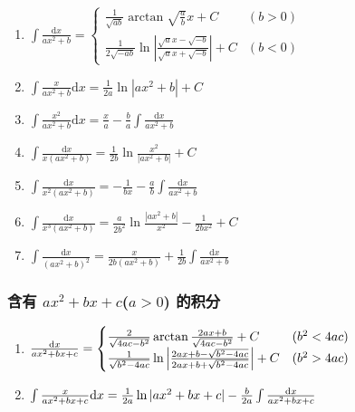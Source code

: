 \begin{small}
\begin{enumerate}

\item $ \int \frac{\mathrm{d}x}{ax^2+b} = \begin{cases}
\frac{1}{\sqrt{ab}} \arctan \sqrt{\frac{a}{b}} x + C & (b > 0) \\
\frac{1}{2\sqrt{-ab}} \ln\left| \frac{\sqrt{a}x-\sqrt{-b}}{\sqrt{a}x+\sqrt{-b}} \right| + C & (b < 0)
\end{cases} $

\item $ \int \frac{x}{ax^2+b} \mathrm{d}x = \frac{1}{2a} \ln \left| ax^2 + b \right| + C $

\item $ \int \frac{x^2}{ax^2+b} \mathrm{d}x = \frac{x}{a} - \frac{b}{a}\int \frac{\mathrm{d}x}{ax^2+b} $

\item $ \int \frac{\mathrm{d}x}{x(ax^2+b)} = \frac{1}{2b} \ln \frac{x^2}{|ax^2+b|} + C $

\item $ \int \frac{\mathrm{d}x}{x^2(ax^2+b)} = -\frac{1}{bx} - \frac{a}{b} \int \frac{\mathrm{d}x}{ax^2+b} $

\item $ \int \frac{\mathrm{d}x}{x^3(ax^2+b)} = \frac{a}{2b^2} \ln \frac{|ax^2+b|}{x^2} - \frac{1}{2bx^2} + C $

\item $ \int \frac{\mathrm{d}x}{(ax^2+b)^2} = \frac{x}{2b(ax^2+b)} + \frac{1}{2b} \int \frac{\mathrm{d}x}{ax^2+b} $

\end{enumerate}

\subsubsection{含有 $ax^2+bx+c$($a>0$) 的积分}

\begin{enumerate}

\item $ \frac{\mathrm{d} x}{ax^2+bx+c} = \begin{cases}
\frac{2}{\sqrt{4ac-b^2}}\arctan\frac{2ax+b}{\sqrt{4ac-b^2}} + C & (b^2 < 4ac) \\
\frac{1}{\sqrt{b^2-4ac}}\ln\left| \frac{2ax+b-\sqrt{b^2-4ac}}{2ax+b+\sqrt{b^2-4ac}} \right| + C & (b^2 > 4ac)
\end{cases} $

\item $ \int \frac{x}{ax^2+bx+c} \mathrm{d} x = \frac{1}{2a} \ln |ax^2+bx+c| - \frac{b}{2a} \int \frac{\mathrm{d} x}{ax^2+bx+c} $


\end{enumerate}
\end{small}
